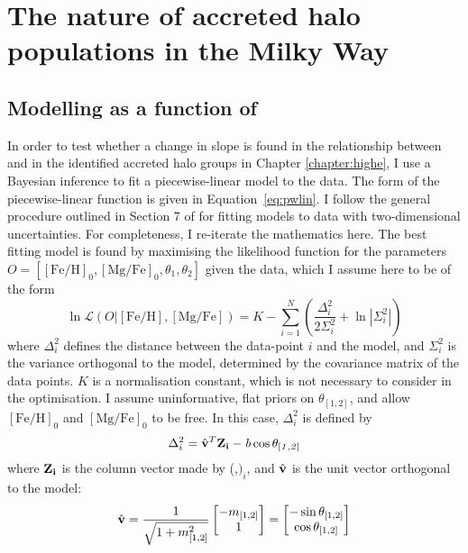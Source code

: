 \chapter{The nature of accreted halo populations in the Milky Way}
\section{Modelling \mgfe{} as a function of \feh{}}
\label{sec:appA}
In order to test whether a change in slope is found in the relationship
between \mgfe{} and \feh{} in the identified accreted halo groups in Chapter \ref{chapter:highe},
I use a Bayesian inference to fit a piecewise-linear model to the
data. The form of the piecewise-linear function is given in
Equation~\ref{eq:pwlin}. I follow the general procedure outlined
in Section 7 of \citet{2010arXiv1008.4686H} for fitting models to
data with two-dimensional uncertainties. For completeness, I
re-iterate the mathematics here. The best fitting model is found
by maximising the likelihood function for the parameters $O =
[\mathrm{[Fe/H]}_0, \mathrm{[Mg/Fe]}_0, \theta_1, \theta_2]$ given
the data, which I assume here to be of the form
\begin{equation}
\ln{\mathcal{L}(O|\mathrm{[Fe/H]}, \mathrm{[Mg/Fe]})} = K -
\sum^{N}_{i=1}\left (\frac{\Delta_i^2}{2\Sigma^2_i} + \ln |\Sigma^{2}_i|\right)
\end{equation} 
where $\Delta_i^2$ defines the distance between the data-point $i$
and the model, and $\Sigma^2_i$ is the variance orthogonal to the
model, determined by the covariance matrix of the data points. $K$
is a normalisation constant, which is not necessary to consider in
the optimisation. I assume uninformative, flat priors on $\theta_{[1,2]}$,
and allow $\mathrm{[Fe/H]}_0$ and $\mathrm{[Mg/Fe]}_0$ to be free.
In this case, $\Delta_i^2$ is defined by
\begin{equation}
\label{eq:delta}
\Delta_i^2 = \hat{\bf{v}}^T \bf{Z}_i - \it{b} \cos\theta_{[1,2]}
\end{equation}
where $\bf{Z}_i$ is the column vector made by (\mgfe{},\feh{}$)_i$,
and $\hat{\bf{v}}$ is the unit vector orthogonal to the model:
\begin{equation}
\hat{\bf{v}} =
\frac{1}{\sqrt{1+m_{[1,2]}^2}}\begin{bmatrix}-m_{[1,2]}\\1\end{bmatrix} =
\begin{bmatrix}-\sin\theta_{[1,2]}\\\cos\theta_{[1,2]} \end{bmatrix}
\end{equation}
